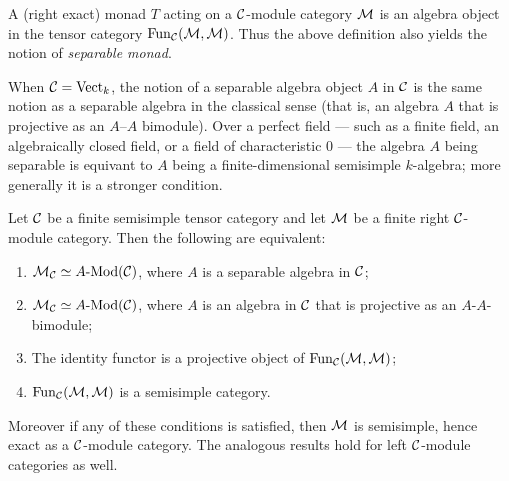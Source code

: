 \documentclass{amsart}
\begin{document}
\begin{remark}
	A (right exact) monad $T$ acting on a $\mathcal C$-module category $\mathcal M$ is an algebra object in the tensor category $\operatorname{Fun}_\mathcal C(\mathcal M, \mathcal M)$. Thus the above definition also yields the notion of {\em separable monad}. 
\end{remark}

\begin{remark}
	When $\mathcal C = \mathrm{Vect}_k$, the notion of a separable algebra object $A$ in $\mathcal C$ is the same notion as a separable algebra in the classical sense (that is, an algebra $A$ that is projective as an $A$--$A$ bimodule). Over a perfect field --- such as a finite field, an algebraically closed field, or a field of characteristic $0$ --- the algebra $A$ being separable is equivant to $A$ being a finite-dimensional semisimple $k$-algebra; more generally it is a stronger condition. 
\end{remark}

\begin{theorem} \label{thm:SepModCats}
	Let $\mathcal C$ be a finite semisimple tensor category and let $\mathcal M$ be a finite right $\mathcal C$-module category. Then the following are equivalent:
	\begin{enumerate}
		\item $\cM_\cC \simeq \Mod{A}{}(\cC)$, where $A$ is a separable algebra in $\mathcal C$;
		\item $\cM_\cC \simeq \Mod{A}{}(\cC)$, where $A$ is an algebra in $\mathcal C$ that is projective as an $A$-$A$-bimodule;
		\item The identity functor is a projective object of $\operatorname{Fun}_\mathcal C(\mathcal M, \mathcal M)$;
		\item $\operatorname{Fun}_\mathcal C(\mathcal M, \mathcal M)$ is a semisimple category. 
	\end{enumerate}
	Moreover if any of these conditions is satisfied, then $\mathcal M$ is semisimple, hence exact as a $\mathcal C$-module category. The analogous results hold for left $\mathcal C$-module categories as well. 
\end{theorem}
\end{document}
